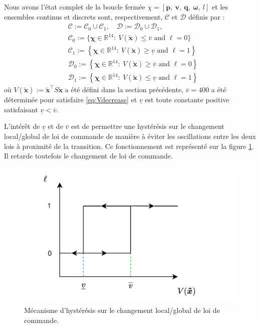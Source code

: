 Nous avons l'état complet de la boucle fermée $\chi = \left[\boldsymbol{p},~ \boldsymbol{v},~ \boldsymbol{q},~  \boldsymbol{\omega},~ l\right]$ et les ensembles continus et discrets sont, respectivement, $\mathcal{C}$ et $\mathcal{D}$ définis par :
\begin{align*}
    & \mathcal{C} := \mathcal{C}_{0} \cup \mathcal{C}_{1}, \quad \mathcal{D} := \mathcal{D}_{0} \cup \mathcal{D}_{1},\\
   & \mathcal{C}_{0} :=\{\boldsymbol{\chi} \in \mathbb{R}^{14}:~ V(\boldsymbol{\tilde x}) \le \overline{v} \mbox{ and } \ell=0\}\\
   & \mathcal{C}_{1} :=\left\{\boldsymbol{\chi} \in \mathbb{R}^{14}:~ V(\boldsymbol{\tilde x}) \ge \underline{v} \mbox{ and } \ell=1 \right\}\\
   & \mathcal{D}_{0} :=\left\{\boldsymbol{\chi} \in \mathbb{R}^{14}:~ V(\boldsymbol{\tilde x}) \geq \overline{v}\mbox{ and } \ell=0 \right\}\\
   & \mathcal{D}_{1} :=\left\{\boldsymbol{\chi} \in \mathbb{R}^{14}:~ V(\boldsymbol{\tilde x}) \leq \underline{v}\mbox{ and } \ell=1 \right\}
\end{align*}
où $V(\boldsymbol{\tilde x}) := \boldsymbol{\tilde x}^\top S \boldsymbol{\tilde x}$  a été défini dans la section précédente, $\overline{v}=400$ a été déterminée pour satisfaire \eqref{eq:Vdecrease} et $\underline{v}$ est toute constante positive satisfaisant $\underline{v}<\overline{v}$.

L'intérêt de $\underline{v}$ et de $\overline{v}$ est de permettre une hystérésis sur le changement local/global de loi de commande de manière à éviter les oscillations entre les deux lois à proximité de la transition. Ce fonctionnement est représenté sur la figure \ref{fig:hysteresis}. Il retarde toutefois le changement de loi de commande.

\begin{figure}[ht!]
  \centering
  \includegraphics[trim=0cm 0cm 0cm 0cm,clip,width=0.8\columnwidth]{figures/hysteresis.png}
  \caption{Mécanisme d'hystérésis sur le changement local/global de loi de commande.}
  \label{fig:hysteresis}
\end{figure}

